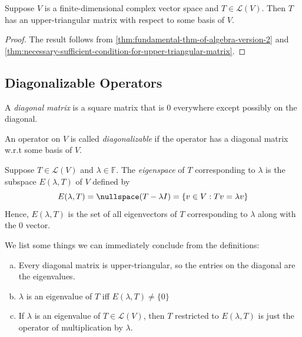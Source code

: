 \documentclass{article}
\begin{document}
\begin{theorem}[if $\mathbb{F} = \mathbb{C}$, then every operator on
  $V$ has an upper-triangular matrix]
  Suppose $V$ is a finite-dimensional complex vector space and $T \in
  \mathcal{L}(V)$. Then $T$ has an upper-triangular matrix with
  respect to some basis of $V$.
\end{theorem}
\begin{proof}
  The result follows from \cref{thm:fundamental-thm-of-algebra-version-2} and \cref{thm:necessary-sufficient-condition-for-upper-triangular-matrix}.
\end{proof}


\subsection{Diagonalizable Operators}

\begin{definition}
  A \textit{diagonal matrix} is a square matrix that is $0$ everywhere
  except possibly on the diagonal.
\end{definition}

\begin{definition}[diagonalizable]
  \label{def:diagonalizable}
  An operator on $V$ is called \textit{diagonalizable} if the operator
  has a diagonal matrix w.r.t some basis of $V$.
\end{definition}

\begin{definition}[eigenspace]
  \label{def:eigenspace}
  Suppose $T \in \mathcal{L}(V)$ and $\lambda \in \mathbb{F}$. The
  \textit{eigenspace} of $T$ corresponding to $\lambda$ is the
  subspace $E(\lambda, T)$ of $V$ defined by
  $$E(\lambda, T) = \nullspace(T - \lambda I) = \{v \in V: Tv =
  \lambda v\}$$
  Hence, $E(\lambda, T)$ is the set of all eigenvectors of $T$
  corresponding to $\lambda$ along with the $0$ vector.
\end{definition}

\begin{remark}
  We list some things we can immediately conclude from the
  definitions:
  \begin{enumerate}[(a)]
  \item
    Every diagonal matrix is upper-triangular, so the entries on the
    diagonal are the eigenvalues.
  \item
    $\lambda$ is an eigenvalue of $T$ iff $E(\lambda, T) \ne \{0\}$
  \item
    If $\lambda$ is an eigenvalue of $T \in \mathcal{L}(V)$, then $T$
    restricted to $E(\lambda, T)$ is just the operator of
    multiplication by $\lambda$.
  \end{enumerate}
\end{remark}
\end{document}
